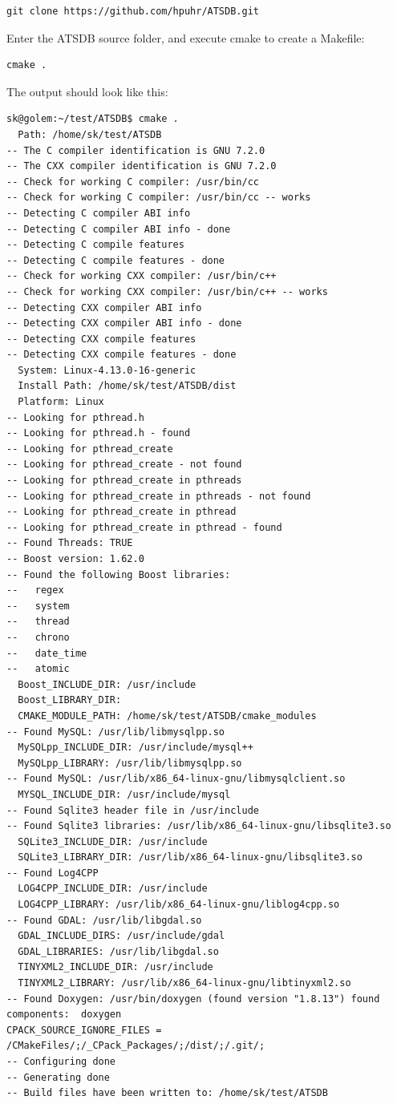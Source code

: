 \documentclass[10pt,letterpaper,extrafontsizes]{memoir}
\begin{document}
\begin{verbatim}
git clone https://github.com/hpuhr/ATSDB.git
\end{verbatim}

Enter the ATSDB source folder, and execute cmake to create a Makefile:

\begin{verbatim}
cmake .
\end{verbatim}

The output should look like this:
\begin{verbatim}
sk@golem:~/test/ATSDB$ cmake .
  Path: /home/sk/test/ATSDB
-- The C compiler identification is GNU 7.2.0
-- The CXX compiler identification is GNU 7.2.0
-- Check for working C compiler: /usr/bin/cc
-- Check for working C compiler: /usr/bin/cc -- works
-- Detecting C compiler ABI info
-- Detecting C compiler ABI info - done
-- Detecting C compile features
-- Detecting C compile features - done
-- Check for working CXX compiler: /usr/bin/c++
-- Check for working CXX compiler: /usr/bin/c++ -- works
-- Detecting CXX compiler ABI info
-- Detecting CXX compiler ABI info - done
-- Detecting CXX compile features
-- Detecting CXX compile features - done
  System: Linux-4.13.0-16-generic
  Install Path: /home/sk/test/ATSDB/dist
  Platform: Linux
-- Looking for pthread.h
-- Looking for pthread.h - found
-- Looking for pthread_create
-- Looking for pthread_create - not found
-- Looking for pthread_create in pthreads
-- Looking for pthread_create in pthreads - not found
-- Looking for pthread_create in pthread
-- Looking for pthread_create in pthread - found
-- Found Threads: TRUE  
-- Boost version: 1.62.0
-- Found the following Boost libraries:
--   regex
--   system
--   thread
--   chrono
--   date_time
--   atomic
  Boost_INCLUDE_DIR: /usr/include
  Boost_LIBRARY_DIR: 
  CMAKE_MODULE_PATH: /home/sk/test/ATSDB/cmake_modules
-- Found MySQL: /usr/lib/libmysqlpp.so
  MySQLpp_INCLUDE_DIR: /usr/include/mysql++
  MySQLpp_LIBRARY: /usr/lib/libmysqlpp.so
-- Found MySQL: /usr/lib/x86_64-linux-gnu/libmysqlclient.so
  MYSQL_INCLUDE_DIR: /usr/include/mysql
-- Found Sqlite3 header file in /usr/include
-- Found Sqlite3 libraries: /usr/lib/x86_64-linux-gnu/libsqlite3.so
  SQLite3_INCLUDE_DIR: /usr/include
  SQLite3_LIBRARY_DIR: /usr/lib/x86_64-linux-gnu/libsqlite3.so
-- Found Log4CPP
  LOG4CPP_INCLUDE_DIR: /usr/include
  LOG4CPP_LIBRARY: /usr/lib/x86_64-linux-gnu/liblog4cpp.so
-- Found GDAL: /usr/lib/libgdal.so  
  GDAL_INCLUDE_DIRS: /usr/include/gdal
  GDAL_LIBRARIES: /usr/lib/libgdal.so
  TINYXML2_INCLUDE_DIR: /usr/include
  TINYXML2_LIBRARY: /usr/lib/x86_64-linux-gnu/libtinyxml2.so
-- Found Doxygen: /usr/bin/doxygen (found version "1.8.13") found components:  doxygen 
CPACK_SOURCE_IGNORE_FILES = /CMakeFiles/;/_CPack_Packages/;/dist/;/.git/;
-- Configuring done
-- Generating done
-- Build files have been written to: /home/sk/test/ATSDB
\end{verbatim}
\end{document}
